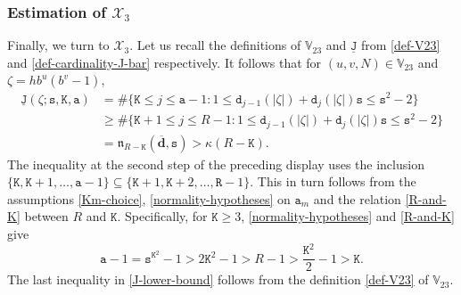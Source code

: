 \documentclass[12pt, twoside]{article}
\def\red{\color{red}}
\theoremstyle{definition}
\numberwithin{equation}{section}
\begin{document}
\subsubsection{Estimation of $\mathcal X_3$}  \label{X3-estimation-section} 
Finally, we turn to $\mathcal X_3$. Let us recall the definitions of $\mathbb V_{23}$ and $\underline{\mathtt J}$ from \eqref{def-V23} and \eqref{def-cardinality-J-bar} respectively. It follows that for $(u,v, N) \in \mathbb V_{23}$ and $\zeta = h b^u(b^v-1)$, 
\begin{align} 
\underline{\mathtt J}(\zeta; \mathtt s, \mathtt K, \mathtt a) &= \# \bigl\{ \mathtt K \leq j \leq \mathtt a -1: 1 \leq \mathtt d_{j-1}({|\zeta|}) + \mathtt d_j({|\zeta|}) \mathtt s \leq \mathtt s^2-2  \bigr\} \nonumber \\
&\geq \# \bigl\{ \mathtt K + 1 \leq j \leq   R-1: 1 \leq \mathtt d_{j-1}({|\zeta|}) + \mathtt d_j({|\zeta|}) \mathtt s \leq \mathtt s^2-2  \bigr\} \nonumber \\ 
& = \mathfrak n_{R - \mathtt K}(\overline{\mathbf d}, \mathtt s) >  \kappa (R - \mathtt K).  \label{J-lower-bound} 
\end{align} 
The inequality at the second step of the preceding display uses the inclusion $\{\mathtt K, \mathtt K+1, \ldots, \mathtt a-1\} \subseteq \{\mathtt K+1, \mathtt K+2, \ldots, \mathtt R-1 \}$. This in turn follows from the assumptions \eqref{Km-choice}, \eqref{normality-hypotheses} on $\mathtt a_m$ and the relation \eqref{R-and-K} between $R$ and $\mathtt K$. Specifically, for $\mathtt K \geq 3$, \eqref{normality-hypotheses} and \eqref{R-and-K} give 
\[ \mathtt a -1 = \mathtt s^{\mathtt K^2} -1 > 2 \mathtt K^2 -1 > R -1 > \frac{\mathtt K^2}{2} -1> \mathtt K. \] 
The last inequality in \eqref{J-lower-bound} follows from the definition \eqref{def-V23} of $\mathbb V_{23}$. 
\end{document}
